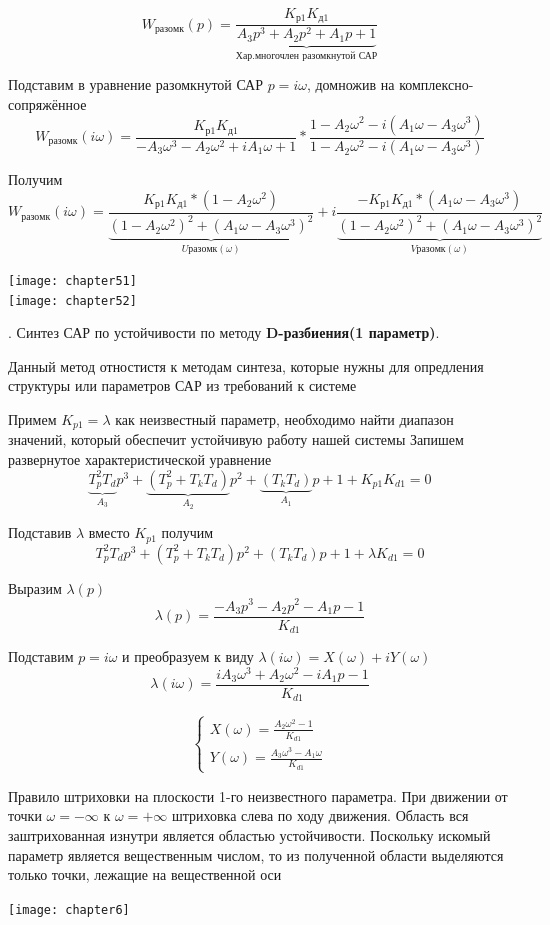\documentclass[12pt, a4paper]{report}
\begin{document}
$$ W_{разомк}(p) = \frac{K_{р1}K_{д1}}{\underbrace{A_{3}p^{3} + A_{2}p^{2} + A_{1}p + 1}_{\text{Хар.многочлен разомкнутой САР}}} $$

Подставим в уравнение разомкнутой САР $ p = i\omega $, домножив на комплексно-сопряжённое
$$ W_{разомк}(i\omega) = \frac{K_{р1}K_{д1}}{-A_{3}\omega^{3} - A_{2}\omega^{2} + iA_{1}\omega + 1}*
    \frac{1-A_{2}\omega^{2}-i(A_{1}\omega-A_{3}\omega^{3})}{1-A_{2}\omega^{2}-i(A_{1}\omega-A_{3}\omega^{3})} $$

Получим
$$ W_{разомк}(i\omega) = \frac{K_{р1}K_{д1}*(1-A_{2}\omega^{2})} {\underbrace{(1-A_{2}\omega^{2})^{2}+(A_{1}\omega-A_{3}\omega^{3})^{2}}_{Uразомк(\omega)}} +
    i\frac{-K_{р1}K_{д1}*(A_{1}\omega-A_{3}\omega^{3})} {\underbrace{(1-A_{2}\omega^{2})^{2}+(A_{1}\omega-A_{3}\omega^{3})^{2}}_{Vразомк(\omega)}} $$

\texttt{[image: chapter51]}\\
\texttt{[image: chapter52]}

. Синтез САР по устойчивости по методу \textbf{D-разбиения(1 параметр)}.

Данный метод отностистя к методам синтеза, которые нужны для опредления структуры или параметров САР из требований к системе

Примем $ K_{p1} = \lambda$ как неизвестный параметр, необходимо найти диапазон значений, который обеспечит устойчивую работу нашей системы
Запишем развернутое характеристической уравнение
$$\underbrace{T_{p}^2T_{d}}_{A_{3}}p^{3} + \underbrace{(T_{p}^{2} + T_{k}T_{d})}_{A_{2}}p^{2} + \underbrace{(T_{k}T_{d})}_{A_{1}}p + 1 + K_{p1}K_{d1} = 0 $$

Подставив $ \lambda $ вместо $ K_{p1} $ получим
$$ T_{p}^2T_{d}p^{3} + (T_{p}^{2} + T_{k}T_{d})p^{2} + (T_{k}T_{d})p + 1 + \lambda K_{d1} = 0 $$

Выразим $ \lambda(p) $
$$ \lambda(p) = \frac{- A_{3}p^{3} - A_{2}p^{2} - A_{1}p - 1}{K_{d1}} $$

Подставим $ p = i\omega $ и преобразуем к виду $ \lambda(i\omega) = X(\omega) + iY(\omega) $
$$ \lambda(i\omega) = \frac{iA_{3}\omega^{3} + A_{2}\omega^{2} - iA_{1}p - 1}{K_{d1}} $$

$$ \begin{cases}
        X(\omega) = \frac{A_{2}\omega^{2} - 1}{K_{d1}} \\
        Y(\omega) = \frac{A_{3}\omega^{3} - A_{1}\omega}{K_{d1}}
        \end{cases}
$$

Правило штриховки на плоскости 1-го неизвестного параметра. При движении от точки $ \omega = -\infty $ к $ \omega = +\infty $
штриховка слева по ходу движения. Область вся заштрихованная изнутри является областью устойчивости.
Поскольку искомый параметр является вещественным числом, то из полученной области выделяются только точки, лежащие на вещественной оси

\texttt{[image: chapter6]}
\end{document}
